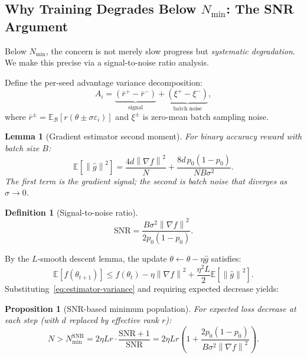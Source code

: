 \documentclass[11pt]{article}
\newtheorem{proposition}[theorem]{Proposition}
\newtheorem{lemma}[theorem]{Lemma}
\theoremstyle{definition}
\newtheorem{definition}[theorem]{Definition}
\theoremstyle{remark}
\newcommand{\E}{\mathbb{E}}
\newcommand{\norm}[1]{\left\|#1\right\|}
\newcommand{\Nmin}{N_{\mathrm{min}}}
\newcommand{\SNR}{\mathrm{SNR}}
\begin{document}
\subsection{Why Training Degrades Below $\Nmin$: The SNR Argument}
\label{sec:snr}

Below $\Nmin$, the concern is not merely slow progress but \emph{systematic degradation}. We make this precise via a signal-to-noise ratio analysis.

Define the per-seed advantage variance decomposition:
\begin{equation}
  A_i = \underbrace{(\bar r^+ - \bar r^-)}_{\text{signal}} + \underbrace{(\xi^+ - \xi^-)}_{\text{batch noise}},
\end{equation}
where $\bar r^\pm = \E_{\mathcal{B}}[r(\theta \pm \sigma\varepsilon_i)]$ and $\xi^\pm$ is zero-mean batch sampling noise.

\begin{lemma}[Gradient estimator second moment]
\label{lem:estimator-variance}
For binary accuracy reward with batch size $B$:
\begin{equation}
  \E\!\left[\norm{\hat{g}}^2\right] = \frac{4d\norm{\nabla f}^2}{N} + \frac{8d\, p_0(1-p_0)}{NB\sigma^2}.
  \label{eq:estimator-variance}
\end{equation}
The first term is the gradient signal; the second is batch noise that diverges as $\sigma \to 0$.
\end{lemma}

\begin{definition}[Signal-to-noise ratio]
\begin{equation}
  \SNR = \frac{B\sigma^2\norm{\nabla f}^2}{2p_0(1-p_0)}.
  \label{eq:snr}
\end{equation}
\end{definition}

By the $L$-smooth descent lemma, the update $\theta \leftarrow \theta - \eta\hat{g}$ satisfies:
\begin{equation}
  \E[f(\theta_{t+1})] \leq f(\theta_t) - \eta\norm{\nabla f}^2 + \frac{\eta^2 L}{2}\E\!\left[\norm{\hat{g}}^2\right].
  \label{eq:descent-lemma}
\end{equation}
Substituting~\eqref{eq:estimator-variance} and requiring expected decrease yields:

\begin{proposition}[SNR-based minimum population]
\label{prop:snr-nmin}
For expected loss decrease at each step (with $d$ replaced by effective rank $r$):
\begin{equation}
  N > \Nmin^{\mathrm{SNR}} = 2\eta Lr \cdot \frac{\SNR + 1}{\SNR} = 2\eta Lr\!\left(1 + \frac{2p_0(1-p_0)}{B\sigma^2\norm{\nabla f}^2}\right).
  \label{eq:snr-nmin}
\end{equation}
\end{proposition}
\end{document}
